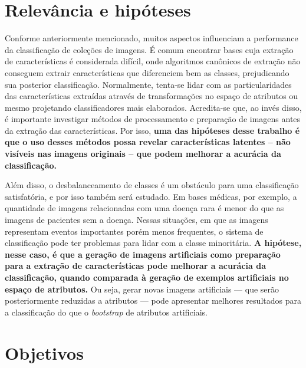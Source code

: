 \section{Relevância e hipóteses}

Conforme anteriormente mencionado, muitos aspectos influenciam a performance da classificação de coleções de imagens. É comum encontrar bases cuja extração de características é considerada difícil, onde algoritmos canônicos de extração não conseguem extrair características que diferenciem bem as classes, prejudicando sua posterior classificação. Normalmente, tenta-se lidar com as particularidades das características extraídas através de transformações no espaço de atributos ou mesmo projetando classificadores mais elaborados. Acredita-se que, ao invés disso, é importante investigar métodos de processamento e preparação de imagens antes da extração das características. Por isso, {\bf uma das hipóteses desse trabalho é que o uso desses métodos possa revelar características latentes -- não visíveis nas imagens originais -- que podem melhorar a acurácia da classificação.}


Além disso, 
o desbalanceamento de classes é um obstáculo para uma classificação satisfatória, e por isso também será estudado.
Em bases médicas, por exemplo, a quantidade de imagens relacionadas com uma doença rara é menor do que as imagens de pacientes sem a doença. Nessas situações, em que as imagens representam eventos importantes porém menos frequentes, o sistema de classificação pode ter problemas para lidar com a classe minoritária. {\bf A hipótese, nesse caso, é que a geração de imagens artificiais como preparação para a extração de características pode melhorar a acurácia da classificação, quando comparada à geração de exemplos artificiais no espaço de atributos.} Ou seja, gerar novas imagens artificiais — que serão posteriormente reduzidas a atributos — pode apresentar melhores resultados para a classificação do que o \textit{bootstrap} de atributos artificiais.

\section{Objetivos}

